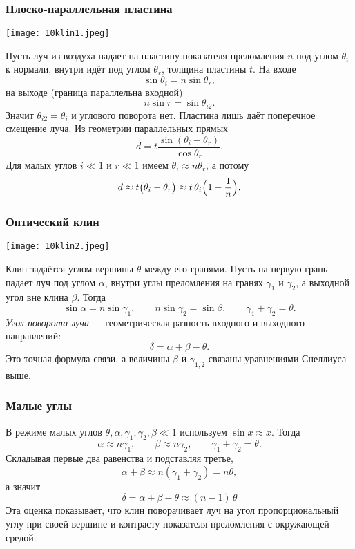 \documentclass[12pt, a4paper]{article}%
\begin{document}
\subsubsection*{Плоско-параллельная пластина}
\begin{center}
\texttt{[image: 10klin1.jpeg]}
\label{fig:mpr}
\end{center}

Пусть луч из воздуха падает на пластину показателя преломления $n$ под углом $\theta_i$ к нормали, внутри идёт под углом $\theta_r$, толщина пластины $t$. На входе
\[
\sin \theta_i = n \sin \theta_r,
\]
на выходе (граница параллельна входной)
\[
n \sin r = \sin \theta_{i2}.
\]
Значит $\theta_{i2} = \theta_i$ и углового поворота нет. Пластина лишь даёт поперечное смещение луча. Из геометрии параллельных прямых
\[
d = t \frac{\sin(\theta_i - \theta_r)}{\cos \theta_r}.
\]
Для малых углов $i\ll1$ и $r\ll1$ имеем $\theta_i \approx n \theta_r$, а потому
\[
d \approx t \bigl(\theta_i - \theta_r\bigr) \approx t\,\theta_i\Bigl(1 - \frac{1}{n}\Bigr).
\]

\subsubsection*{Оптический клин}

\begin{center}
\texttt{[image: 10klin2.jpeg]}
\label{fig:mpr}
\end{center}

Клин задаётся углом вершины $\theta$ между его гранями. Пусть на первую грань падает луч под углом $\alpha$, внутри углы преломления на гранях $\gamma_1$ и $\gamma_2$, а выходной угол вне клина $\beta$. Тогда
\[
\sin \alpha = n \sin \gamma_1,\qquad n \sin \gamma_2 = \sin \beta,\qquad \gamma_1 + \gamma_2 = \theta.
\]
\textit{Угол поворота луча} — геометрическая разность входного и выходного направлений:
\[
\delta = \alpha + \beta - \theta.
\]
Это точная формула связи, а величины $\beta$ и $\gamma_{1,2}$ связаны уравнениями Снеллиуса выше.

\subsubsection*{Малые углы}
В режиме малых углов $\theta, \alpha, \gamma_1, \gamma_2, \beta \ll 1$ используем $\sin x \approx x$. Тогда
\[
\alpha \approx n \gamma_1,\qquad \beta \approx n \gamma_2,\qquad \gamma_1 + \gamma_2 = \theta.
\]
Складывая первые два равенства и подставляя третье,
\[
\alpha + \beta \approx n(\gamma_1 + \gamma_2) = n\theta,
\]
а значит
\[
 \delta = \alpha + \beta - \theta \approx (n - 1)\,\theta 
\]
Эта оценка показывает, что клин поворачивает луч на угол пропорциональный углу при своей вершине и контрасту показателя преломления с окружающей средой.
\end{document}
